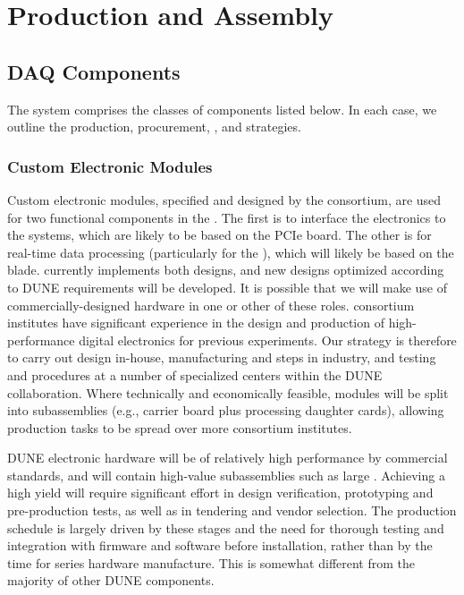 
\section{Production and Assembly}
\label{sec:fd-daq-prod-assy}

\subsection{DAQ Components}

The   system comprises the classes of components listed below. In each case, we outline the production, procurement, , and  strategies.

\subsubsection{Custom Electronic Modules}

Custom electronic modules, specified and designed by the 
consortium, are used for two functional components in the 
. 
The first is to interface the  electronics to the   systems, which are likely to be based on the 
PCIe board.
The other is for real-time data processing (particularly for the
), which will likely be based on the
  blade.
 currently implements both designs, and new designs optimized according to
DUNE requirements will be developed.
It is possible that we will make use of commercially-designed hardware
in one or other of these roles.  consortium institutes have
significant experience in the design and production of high-performance digital electronics for previous experiments.
Our strategy is therefore to carry out design in-house, manufacturing
and  steps in industry, and testing and  procedures at a number of
specialized centers within the DUNE collaboration. 
Where technically and economically feasible, modules will be split
into subassemblies (e.g., carrier board plus processing
daughter cards), allowing production tasks to be spread over more
consortium institutes.

DUNE electronic hardware will be of relatively high performance by commercial standards, and will contain high-value subassemblies such as large . Achieving a high yield will require significant effort in design verification, prototyping and pre-production tests, as well as in tendering and vendor selection. The production schedule is largely driven by these stages and the need for thorough testing and integration with firmware and software before installation, rather than by the time for series hardware manufacture. This is somewhat different from the majority of other DUNE  components.

